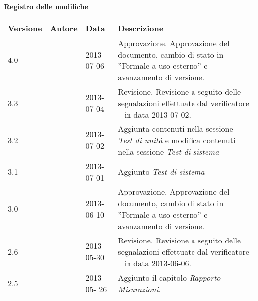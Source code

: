\Large{\textbf{Registro delle modifiche}}\\
\normalsize

	\label{tabVers}
	\begin{longtable}{p{} p{} p{} p{}} 
	    \toprule
	    \textbf{Versione}	&	\textbf{Autore}	&	\textbf{Data}		&	\textbf{Descrizione}\\
	    \midrule
	    \midrule
	    	    4.0		&	\MB		&	2013-07-06	&	Approvazione.\newline
												Approvazione del documento, cambio di stato in ”Formale a uso esterno” e avanzamento di versione. \\
		 \midrule
	    	   3.3		&	\DC		&	2013-07-04	&	Revisione.\newline
												Revisione a seguito delle segnalazioni effettuate dal verificatore \SL~ in data 2013-07-02. \\
		\midrule
	    	    3.2		&	\DC		&	2013-07-02		&	Aggiunta contenuti nella sessione \emph{Test di unità} e modifica contenuti nella sessione \emph{Test di sistema}\\										
	    \midrule
	    	    3.1		&	\DC		&	2013-07-01		&	Aggiunto \emph{Test di sistema}\\
	    \midrule
	    	    3.0		&	\VP		&	2013-06-10	&	Approvazione.\newline
												Approvazione del documento, cambio di stato in ”Formale a uso esterno” e avanzamento di versione. \\
	    \midrule
	    	    2.6		&	\MB		&	2013-05-30	&	Revisione.\newline
												Revisione a seguito delle segnalazioni effettuate dal verificatore \EZ~ in data 2013-06-06. \\
			\midrule
	       	2.5		&	\MB		&	2013-05-	26 &	 Aggiunto il capitolo \emph{Rapporto Misurazioni}.\\
	    

\end{longtable}
